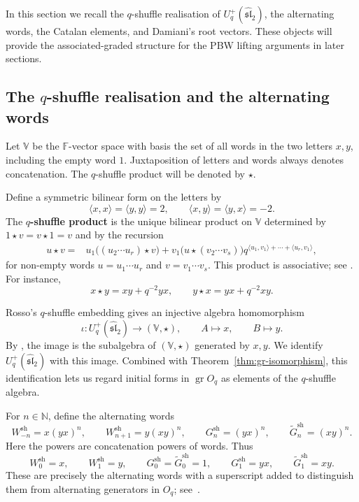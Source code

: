 \documentclass[11pt]{extarticle}
\theoremstyle{definition}
\theoremstyle{remark}
\numberwithin{equation}{section}
\newcommand{\F}{\mathbb F}
\newcommand{\N}{\mathbb N}
\newcommand{\Oq}{O_q}
\newcommand{\Uplus}{U_q^+(\widehat{\mathfrak{sl}}_2)}
\newcommand{\Vsh}{\mathbb V}
\newcommand{\gr}{\operatorname{gr}}
\newcommand{\sh}{\mathrm{sh}}
\begin{document}
In this section we recall the \(q\)-shuffle realisation of \(\Uplus\), the
alternating words, the Catalan elements, and Damiani's root vectors.  These
objects will provide the associated-graded structure for the PBW lifting
arguments in later sections.

\subsection{The \texorpdfstring{\(q\)}{q}-shuffle realisation and the alternating words}

Let \(\Vsh\) be the \(\F\)-vector space with basis the set of all words in
the two letters \(x,y\), including the empty word \(1\).  Juxtaposition of
letters and words always denotes concatenation.  The \(q\)-shuffle product
will be denoted by \(\star\).

Define a symmetric bilinear form on the letters by
\[
 \langle x,x\rangle=\langle y,y\rangle=2,\qquad
 \langle x,y\rangle=\langle y,x\rangle=-2 .
\]
The \textbf{\(q\)-shuffle product} is the unique bilinear product on \(\Vsh\)
determined by \(1\star v=v\star1=v\) and by the recursion
\begin{equation}
\label{eq:qshuffle-recursion}
\begin{split}
 u\star v
={}&
 u_1\bigl((u_2\cdots u_r)\star v\bigr)+
 v_1\bigl(u\star(v_2\cdots v_s)\bigr)
 q^{\langle u_1,v_1\rangle+\cdots+\langle u_r,v_1\rangle},
\end{split}
\end{equation}
for non-empty words \(u=u_1\cdots u_r\) and \(v=v_1\cdots v_s\).  This
product is associative; see \cite[Section~4, equations~(8)--(12)]
{Terwilliger2019Alternating}.  For instance,
\[
        x\star y=xy+q^{-2}yx,\qquad
        y\star x=yx+q^{-2}xy .
\]

Rosso's \(q\)-shuffle embedding \cite{Rosso1998} gives an injective algebra homomorphism
\[
        \iota:\Uplus\longrightarrow(\Vsh,\star),
        \qquad
        A\longmapsto x,\qquad B\longmapsto y .
\]
By \cite[Definition~4.2 and the paragraph following equations~(14)--(15)]{Terwilliger2019Alternating}, the image is the
subalgebra of \((\Vsh,\star)\) generated by \(x,y\).  
We identify
\(\Uplus\) with this image.  Combined with
Theorem~\ref{thm:gr-isomorphism}, this identification lets us regard
initial forms in \(\gr\Oq\) as elements of the \(q\)-shuffle algebra.

For \(n\in\N\), define the alternating words
\begin{equation}
\label{eq:alternating-words}
 W_{-n}^{\sh}=x(yx)^n,\qquad
 W_{n+1}^{\sh}=y(xy)^n,\qquad
 G_n^{\sh}=(yx)^n,\qquad
 \widetilde G_n^{\sh}=(xy)^n .
\end{equation}
Here the powers are concatenation powers of words.  Thus
\[
 W_0^{\sh}=x,\qquad W_1^{\sh}=y,\qquad
 G_0^{\sh}=\widetilde G_0^{\sh}=1,\qquad
 G_1^{\sh}=yx,\qquad \widetilde G_1^{\sh}=xy .
\]
These are precisely the alternating words with a superscript
added to distinguish them from alternating generators in \(\Oq\); see~\cite[Definitions~5.1--5.2]{Terwilliger2019Alternating}.
\end{document}
